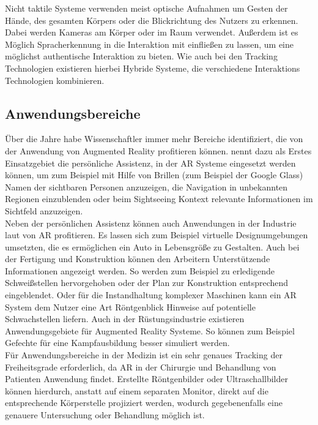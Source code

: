 Nicht taktile Systeme verwenden meist optische Aufnahmen um Gesten der Hände, des gesamten Körpers oder die Blickrichtung des Nutzers zu erkennen. Dabei werden Kameras am Körper oder im Raum verwendet. Außerdem ist es Möglich Spracherkennung in die Interaktion mit einfließen zu lassen, um eine möglichst authentische Interaktion zu bieten. Wie auch bei den Tracking Technologien existieren hierbei Hybride Systeme, die verschiedene Interaktions Technologien kombinieren. \citep{van2010survey} \\

\subsection{Anwendungsbereiche}

Über die Jahre habe Wissenschaftler immer mehr Bereiche identifiziert, die von der Anwendung von Augmented Reality profitieren können. \citet{van2010survey} nennt dazu als Erstes Einsatzgebiet die persönliche Assistenz, in der AR Systeme eingesetzt werden können, um zum Beispiel mit Hilfe von Brillen (zum Beispiel der Google Glass) Namen der sichtbaren Personen anzuzeigen, die Navigation in unbekannten Regionen einzublenden oder beim Sightseeing Kontext relevante Informationen im Sichtfeld anzuzeigen. \\

Neben der persönlichen Assistenz können auch Anwendungen in der Industrie laut \citet{van2010survey} von AR profitieren. Es lassen sich zum Beispiel virtuelle Designumgebungen umsetzten, die es ermöglichen ein Auto in Lebensgröße zu Gestalten. Auch bei der Fertigung und Konstruktion können den Arbeitern Unterstützende Informationen angezeigt werden. So werden zum Beispiel zu erledigende Schweißstellen hervorgehoben oder der Plan zur Konstruktion entsprechend eingeblendet. Oder für die Instandhaltung komplexer Maschinen kann ein AR System dem Nutzer eine Art Röntgenblick Hinweise auf potentielle Schwachstellen liefern. Auch in der Rüstungsindustrie existieren Anwendungsgebiete für Augmented Reality Systeme. So können zum Beispiel Gefechte für eine Kampfausbildung besser simuliert werden. \citep{azuma2001recent} \\

Für Anwendungsbereiche in der Medizin ist ein sehr genaues Tracking der Freiheitsgrade erforderlich, da AR in der Chirurgie und Behandlung von Patienten Anwendung findet. Erstellte Röntgenbilder oder Ultraschallbilder können hierdurch, anstatt auf einem separaten Monitor, direkt auf die entsprechende Körperstelle projiziert werden, wodurch gegebenenfalls eine genauere Untersuchung oder Behandlung möglich ist. \citep{van2010survey} \\

